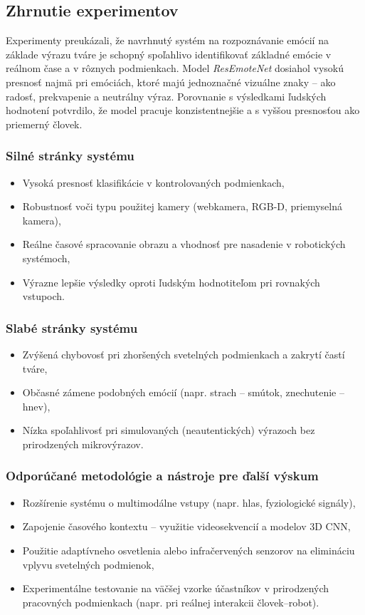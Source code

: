 \subsection{Zhrnutie experimentov}

Experimenty preukázali, že navrhnutý systém na rozpoznávanie emócií na základe výrazu tváre je schopný spoľahlivo identifikovať základné emócie v reálnom čase a v rôznych podmienkach. Model \textit{ResEmoteNet} dosiahol vysokú presnosť najmä pri emóciách, ktoré majú jednoznačné vizuálne znaky – ako radosť, prekvapenie a neutrálny výraz. Porovnanie s výsledkami ľudských hodnotení potvrdilo, že model pracuje konzistentnejšie a s vyššou presnosťou ako priemerný človek.

\subsubsection{Silné stránky systému}
\begin{itemize}
  \item Vysoká presnosť klasifikácie v kontrolovaných podmienkach,
  \item Robustnosť voči typu použitej kamery (webkamera, RGB-D, priemyselná kamera),
  \item Reálne časové spracovanie obrazu a vhodnosť pre nasadenie v robotických systémoch,
  \item Výrazne lepšie výsledky oproti ľudským hodnotiteľom pri rovnakých vstupoch.
\end{itemize}

\subsubsection{Slabé stránky systému}
\begin{itemize}
  \item Zvýšená chybovosť pri zhoršených svetelných podmienkach a zakrytí častí tváre,
  \item Občasné zámene podobných emócií (napr. strach -- smútok, znechutenie -- hnev),
  \item Nízka spoľahlivosť pri simulovaných (neautentických) výrazoch bez prirodzených mikrovýrazov.
\end{itemize}

\subsubsection{Odporúčané metodológie a nástroje pre ďalší výskum}
\begin{itemize}
  \item Rozšírenie systému o multimodálne vstupy (napr. hlas, fyziologické signály),
  \item Zapojenie časového kontextu – využitie videosekvencií a modelov 3D CNN,
  \item Použitie adaptívneho osvetlenia alebo infračervených senzorov na elimináciu vplyvu svetelných podmienok,
  \item Experimentálne testovanie na väčšej vzorke účastníkov v prirodzených pracovných podmienkach (napr. pri reálnej interakcii človek--robot).
\end{itemize}

